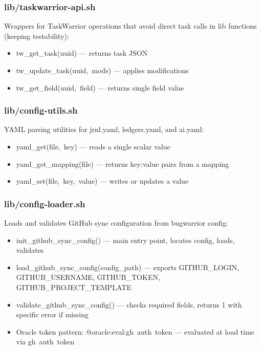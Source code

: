\documentclass[11pt, a4paper, DIV=14]{scrartcl}
\renewcommand{\texttt}[1]{{\ttfamily\fontsize{8.5}{10.5}\selectfont\color{BabbNavy}#1}}
\begin{document}
\subsubsection{lib/taskwarrior-api.sh}\label{libtaskwarrior-api.sh}

Wrappers for TaskWarrior operations that avoid direct \texttt{task}
calls in lib functions (keeping testability):

\begin{itemize}
\tightlist
\item
  \texttt{tw\_get\_task(uuid)} --- returns task JSON
\item
  \texttt{tw\_update\_task(uuid,\ mods)} --- applies modifications
\item
  \texttt{tw\_get\_field(uuid,\ field)} --- returns single field value
\end{itemize}

\subsubsection{lib/config-utils.sh}\label{libconfig-utils.sh}

YAML parsing utilities for jrnl.yaml, ledgers.yaml, and ai.yaml:

\begin{itemize}
\tightlist
\item
  \texttt{yaml\_get(file,\ key)} --- reads a single scalar value
\item
  \texttt{yaml\_get\_mapping(file)} --- returns key:value pairs from a
  mapping
\item
  \texttt{yaml\_set(file,\ key,\ value)} --- writes or updates a value
\end{itemize}

\subsubsection{lib/config-loader.sh}\label{libconfig-loader.sh}

Loads and validates GitHub sync configuration from bugwarrior config:

\begin{itemize}
\tightlist
\item
  \texttt{init\_github\_sync\_config()} --- main entry point, locates
  config, loads, validates
\item
  \texttt{load\_github\_sync\_config(config\_path)} --- exports
  \texttt{GITHUB\_LOGIN}, \texttt{GITHUB\_USERNAME},
  \texttt{GITHUB\_TOKEN}, \texttt{GITHUB\_PROJECT\_TEMPLATE}
\item
  \texttt{validate\_github\_sync\_config()} --- checks required fields,
  returns 1 with specific error if missing
\item
  Oracle token pattern: \texttt{@oracle:eval:gh\ auth\ token} ---
  evaluated at load time via \texttt{gh\ auth\ token}
\end{itemize}
\end{document}
